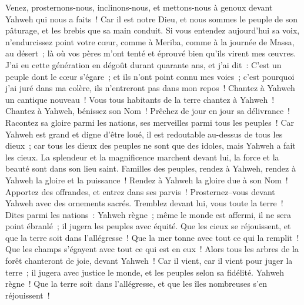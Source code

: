 \begin{multicols}{2}
Venez, prosternons-nous, inclinons-nous, et mettons-nous à genoux devant Yahweh qui nous a faits~!
Car il est notre Dieu, et nous sommes le peuple de son pâturage, et les brebis que sa main conduit. Si vous entendez aujourd'hui sa voix,
n'endurcissez point votre cœur, comme à Meriba, comme à la journée de Massa, au désert~;
là où vos pères m'ont tenté et éprouvé bien qu'ils virent mes œuvres.
J'ai eu cette génération en dégoût durant quarante ans, et j'ai dit~: C'est un peuple dont le cœur s'égare~; et ils n'ont point connu mes voies~;
c'est pourquoi j'ai juré dans ma colère, ils n'entreront pas dans mon repos~!
\VerseOne{}Chantez à Yahweh un cantique nouveau~! Vous tous habitants de la terre chantez à Yahweh~!
Chantez à Yahweh, bénissez son Nom~! Prêchez de jour en jour sa délivrance~!
Racontez sa gloire parmi les nations, ses merveilles parmi tous les peuples~!
Car Yahweh est grand et digne d'être loué, il est redoutable au-dessus de tous les dieux~;
car tous les dieux des peuples ne sont que des idoles, mais Yahweh a fait les cieux.
La splendeur et la magnificence marchent devant lui, la force et la beauté sont dans son lieu saint.
Familles des peuples, rendez à Yahweh, rendez à Yahweh la gloire et la puissance~!
Rendez à Yahweh la gloire due à son Nom~! Apportez des offrandes, et entrez dans ses parvis~!
Prosternez–vous devant Yahweh avec des ornements sacrés. Tremblez devant lui, vous toute la terre~!
Dites parmi les nations~: Yahweh règne~; même le monde est affermi, il ne sera point ébranlé~; il jugera les peuples avec équité.
Que les cieux se réjouissent, et que la terre soit dans l'allégresse~! Que la mer tonne avec tout ce qui la remplit~!
Que les champs s'égayent avec tout ce qui est en eux~! Alors tous les arbres de la forêt chanteront de joie,
devant Yahweh~! Car il vient, car il vient pour juger la terre~; il jugera avec justice le monde, et les peuples selon sa fidélité.
\VerseOne{}Yahweh règne~! Que la terre soit dans l'allégresse, et que les îles nombreuses s'en réjouissent~!

\end{multicols}
